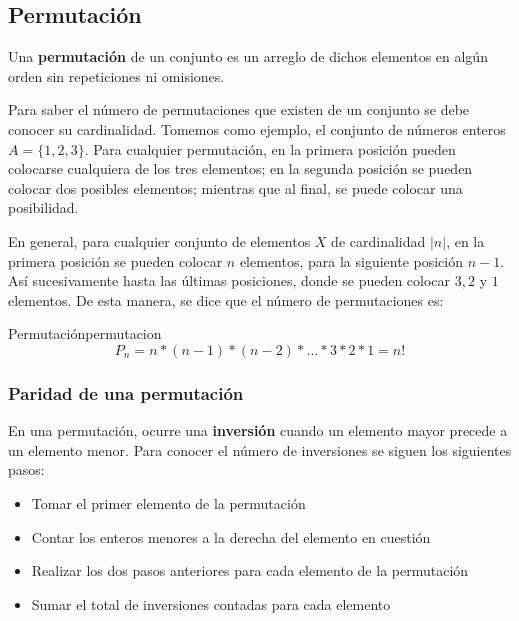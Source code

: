 \subsection{Permutación}


\begin{tcolorbox}[colback=blue!5!white,colframe=blue!60!black,title=Definición: Permutación]
	Una \textbf{permutaci\'on} de un conjunto es un arreglo de dichos elementos en
	alg\'un orden sin repeticiones ni omisiones.
		\label{Permutaciones_definition}
\end{tcolorbox}

Para saber el n\'umero de permutaciones que existen de un conjunto se debe
conocer su cardinalidad. Tomemos como ejemplo, el conjunto de n\'umeros enteros
$A=\{1, 2, 3\}$. Para cualquier permutaci\'on, en la primera posici\'on pueden
colocarse cualquiera de los tres elementos; en la segunda posición se pueden
colocar dos posibles elementos; mientras que al final, se puede colocar una
posibilidad.

En general, para cualquier conjunto de elementos $X$ de cardinalidad $|n|$, en
la primera posici\'on se pueden colocar $n$ elementos, para la siguiente
posici\'on $n-1$. Así sucesivamente hasta las \'ultimas posiciones, donde se
pueden colocar $3, 2$ y $1$ elementos. De esta manera, se dice que el n\'umero
de permutaciones es:

\begin{theorem}{Permutación}{permutacion}
	\begin{equation}
		P_n=n*(n-1)*(n-2)*...*3*2*1=n!
		\label{permutaciones_totales}
	\end{equation}
\end{theorem}

\subsubsection{Paridad de una permutación}

En una permutación, ocurre una \textbf{inversi\'on} cuando un elemento mayor
precede a un elemento menor. Para conocer el n\'umero de inversiones se siguen
los siguientes pasos:

\begin{itemize}
\item Tomar el primer elemento de la permutaci\'on
\item Contar los enteros menores a la derecha del elemento en cuesti\'on
\item Realizar los dos pasos anteriores para cada elemento de la permutaci\'on
\item Sumar el total de inversiones contadas para cada elemento
\end{itemize}


